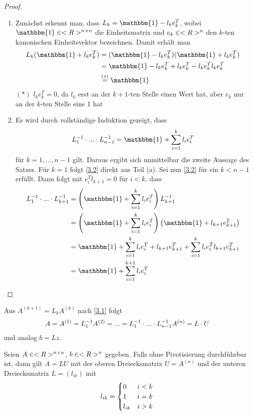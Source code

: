 \begin{proof}
	\begin{enumerate}[label=(\alph*)]
		\item Zunächst erkennt man, dass $L_k=\mathbbm{1}-l_ke_k^T$, wobei $\mathbbm{1}\in\real^{n\times n}$ die Einheitsmatrix und $e_k\in<R>^n$ den $k$-ten kanonischen Einheitsvektor bezeichnen. Damit erhält man
		\begin{align}
		L_k(\mathbbm{1}+l_ke_k^T) &= (\mathbbm{1}-l_ke_k^T)(\mathbbm{1}+l_ke_k^T) \notag \\
		&= \mathbbm{1} - l_ke_k^T + l_ke_k^T - l_ke_k^Tl_ke_k^T \notag \\
		&\overset{(\ast)}{=} \mathbbm{1} \notag
		\end{align}
		$(\ast)$ $l_ke_k^T=0$, da $l_k$ erst an der $k+1$-ten Stelle einen Wert hat, aber $e_k$ nur an der $k$-ten Stelle eine 1 hat
		\item Es wird durch vollständige Induktion gezeigt, dass
		\begin{align}
			\label{3.2}
			L_1^{-1}\cdot ...\cdot L_{n-1}^{-1} = \mathbbm{1} + \sum_{i=1}^{k} l_ie_i^T
		\end{align}
		für $k=1,...,n-1$ gilt. Daraus ergibt sich unmittelbar die zweite Aussage des Satzes. Für $k=1$ folgt \cref{3.2} direkt aus Teil (a). Sei nun \cref{3.2} für ein $k<n-1$ erfüllt. Dann folgt mit $e_i^Tl_{k+1}=0$ für $i<k$, dass
		\begin{align}
			L_1^{-1}\cdot ...\cdot L_{k+1}^{-1} &= \left(\mathbbm{1} + \sum_{i=1}^k l_ie_i^T\right)L_{k+1}^{-1} \notag \\
			&= \left(\mathbbm{1} + \sum_{i=1}^k l_ie_i^T \right) \left( \mathbbm{1} + l_{k+1}e_{k+1}^T\right) \notag \\
			&= \mathbbm{1} + \sum_{i=1}^k l_ie_i^T + l_{k+1}e_{k+1}^T + \sum_{i=1}^k l_ie_i^Tl_{k+1}e_{k+1}^T \notag \\
			&= \mathbbm{1} + \sum_{i=1}^{k+1} l_ie_i^T \notag 
		\end{align}
	\end{enumerate}
\end{proof}

Aus $A^{(k+1)}=L_kA^{(k)}$ nach \cref{3.1} folgt
\begin{align}
	A=A^{(1)} = L_1^{-1}A^{(2)} = ... = L_1^{-1}\cdot ...\cdot L^{-1}_{n-1} A^{(n)} = L\cdot U\notag
\end{align}
und analog $b=Lz$.

\begin{proposition}
	Seien $A\in<R>^{n\times n}$, $b\in<R>^n$ gegeben. Falls  ohne Pivotisierung durchführbar ist, dann gilt $A=LU$ mit der oberen Dreiecksmatrix $U=A^{(n)}$ und der unteren Dreiecksmatrix $L=(l_{ik})$ mit
	\begin{align}
		l_{ik} = \begin{cases}
			0 & i<k \\ 1 & i=k \\ l_{ik} & i>k
		\end{cases}\notag
	\end{align}
\end{proposition}

